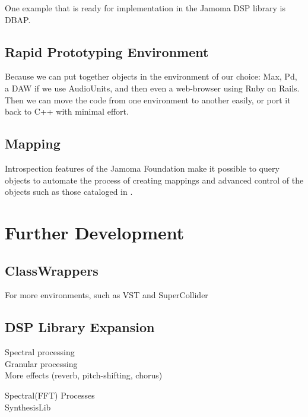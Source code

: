 \documentclass[twoside,10pt]{article}
\begin{document}
One example that is ready for implementation in the Jamoma DSP library is DBAP\cite{Lossius:2009}.


\subsection{Rapid Prototyping Environment}

Because we can put together objects in the environment of our choice: Max, Pd, a DAW if we use AudioUnits, and then even a web-browser using Ruby on Rails.  Then we can move the code from one environment to another easily, or port it back to C++ with minimal effort.

\subsection{Mapping}

Introspection features of the Jamoma Foundation make it possible to query objects to automate the process of creating mappings and advanced control of the objects such as those cataloged in \cite{Pendharkar:2006}.  




\section{Further Development} %


\subsection{ClassWrappers}

For more environments, such as VST and SuperCollider

\subsection{DSP Library Expansion}

Spectral processing \\

Granular processing   \\

More effects (reverb, pitch-shifting, chorus) 


Spectral(FFT) Processes\\

SynthesisLib
\end{document}
